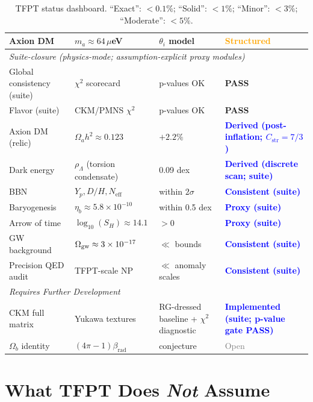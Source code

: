 \begin{table}[H]
\begin{tabular}{@{}p{3cm}p{4cm}p{3cm}l@{}}
\quad Axion DM & $m_a \approx 64\,\mu$eV & $\theta_i$ model & \textcolor{orange}{\textbf{Structured}}\\
\midrule
\multicolumn{4}{l}{\textit{Suite-closure (physics-mode; assumption-explicit proxy modules)}}\\
\quad Global consistency (suite) & $\chi^2$ scorecard & p-values OK & \textcolor{green!60!black}{\textbf{PASS}}\\
\quad Flavor (suite) & CKM/PMNS $\chi^2$ & p-values OK & \textcolor{green!60!black}{\textbf{PASS}}\\
\quad Axion DM (relic) & $\Omega_a h^2 \approx 0.123$ & $+2.2\%$ & \textcolor{blue}{\textbf{Derived (post-inflation; $C_{\mathrm{str}}=7/3$)}}\\
\quad Dark energy & $\rho_\Lambda$ (torsion condensate) & 0.09 dex & \textcolor{blue}{\textbf{Derived (discrete scan; suite)}}\\
\quad BBN & $Y_p, D/H, N_\mathrm{eff}$ & within $2\sigma$ & \textcolor{blue}{\textbf{Consistent (suite)}}\\
\quad Baryogenesis & $\eta_b \approx 5.8\times10^{-10}$ & within 0.5 dex & \textcolor{blue}{\textbf{Proxy (suite)}}\\
\quad Arrow of time & $\log_{10}(S_H)\approx 14.1$ & $>0$ & \textcolor{blue}{\textbf{Proxy (suite)}}\\
\quad GW background & $\Omega_{\rm gw}\approx 3\times10^{-17}$ & $\ll$ bounds & \textcolor{blue}{\textbf{Consistent (suite)}}\\
\quad Precision QED audit & TFPT-scale NP & $\ll$ anomaly scales & \textcolor{blue}{\textbf{Consistent (suite)}}\\
\midrule
\multicolumn{4}{l}{\textit{Requires Further Development}}\\
\quad CKM full matrix & Yukawa textures & RG-dressed baseline + $\chi^2$ diagnostic & \textcolor{blue}{\textbf{Implemented (suite; p-value gate PASS)}}\\
\quad $\Omega_b$ identity & $(4\pi-1)\beta_{\text{rad}}$ & conjecture & \textcolor{gray}{Open}\\
\bottomrule
\end{tabular}
\caption{TFPT status dashboard. ``Exact'': $<0.1\%$; ``Solid'': $<1\%$; 
``Minor'': $<3\%$; ``Moderate'': $<5\%$.}
\label{tab:status}
\end{table}

\section{What TFPT Does \emph{Not} Assume}

